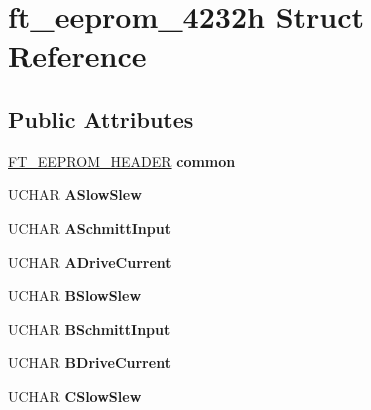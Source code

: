 \hypertarget{structft__eeprom__4232h}{}\section{ft\+\_\+eeprom\+\_\+4232h Struct Reference}
\label{structft__eeprom__4232h}
\subsection*{Public Attributes}
\begin{DoxyCompactItemize}
\item 
\hyperlink{structft__eeprom__header}{F\+T\+\_\+\+E\+E\+P\+R\+O\+M\+\_\+\+H\+E\+A\+D\+ER} {\bfseries common}\hypertarget{structft__eeprom__4232h_acfee0a972954d9a20c82fcd18b082194}{}\label{structft__eeprom__4232h_acfee0a972954d9a20c82fcd18b082194}

\item 
U\+C\+H\+AR {\bfseries A\+Slow\+Slew}\hypertarget{structft__eeprom__4232h_a1e66ea6b513734d830d86565441b6318}{}\label{structft__eeprom__4232h_a1e66ea6b513734d830d86565441b6318}

\item 
U\+C\+H\+AR {\bfseries A\+Schmitt\+Input}\hypertarget{structft__eeprom__4232h_a47fdc0898935fa1d2c60cfcf93685231}{}\label{structft__eeprom__4232h_a47fdc0898935fa1d2c60cfcf93685231}

\item 
U\+C\+H\+AR {\bfseries A\+Drive\+Current}\hypertarget{structft__eeprom__4232h_a67ec1ef6e8b91116d539dd304c9c6f53}{}\label{structft__eeprom__4232h_a67ec1ef6e8b91116d539dd304c9c6f53}

\item 
U\+C\+H\+AR {\bfseries B\+Slow\+Slew}\hypertarget{structft__eeprom__4232h_acd3e611ccee7fc8be7c459e6a436efda}{}\label{structft__eeprom__4232h_acd3e611ccee7fc8be7c459e6a436efda}

\item 
U\+C\+H\+AR {\bfseries B\+Schmitt\+Input}\hypertarget{structft__eeprom__4232h_a8bb143cc9d051960d4aa6fc9be3230d4}{}\label{structft__eeprom__4232h_a8bb143cc9d051960d4aa6fc9be3230d4}

\item 
U\+C\+H\+AR {\bfseries B\+Drive\+Current}\hypertarget{structft__eeprom__4232h_ac42c22b82bdca1458089ac49f0eaefa1}{}\label{structft__eeprom__4232h_ac42c22b82bdca1458089ac49f0eaefa1}

\item 
U\+C\+H\+AR {\bfseries C\+Slow\+Slew}\hypertarget{structft__eeprom__4232h_a6d92eb606cbe5c251751cd2d6fd8bebe}{}\label{structft__eeprom__4232h_a6d92eb606cbe5c251751cd2d6fd8bebe}


\end{DoxyCompactItemize}
